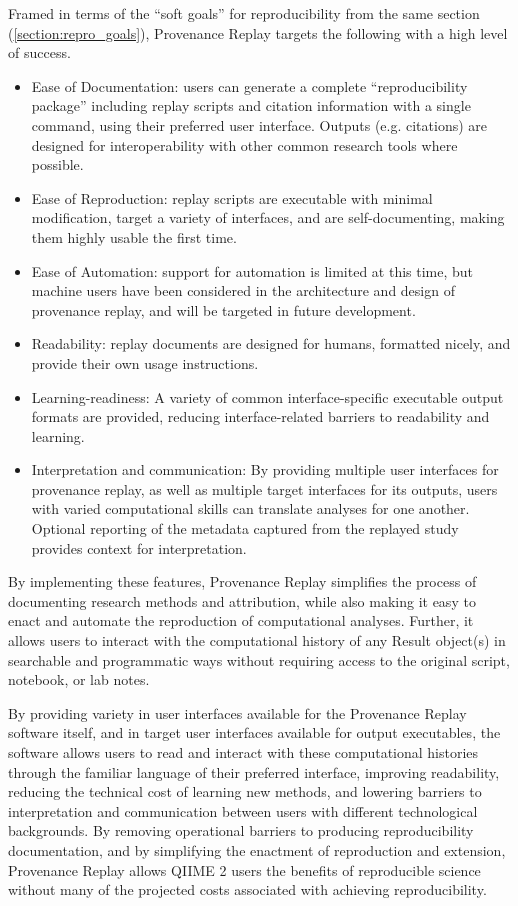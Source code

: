 Framed in terms of the “soft goals” for reproducibility from the same section (\ref{section:repro_goals}),
Provenance Replay targets the following with a high level of success.

\begin{itemize}
    \item Ease of Documentation: users can generate a complete “reproducibility
        package” including replay scripts and citation information with a single
        command, using their preferred user interface. Outputs (e.g. citations) are
        designed for interoperability with other common research tools where
        possible.
    \item Ease of Reproduction: replay scripts are executable with minimal
        modification, target a variety of interfaces, and are self-documenting,
        making them highly usable the first time.
    \item Ease of Automation: support for automation is limited at this time,
        but machine users have been considered in the architecture and design of
        provenance replay, and will be targeted in future development.
    \item Readability: replay documents are designed for humans, formatted
        nicely, and provide their own usage instructions.
    \item Learning-readiness: A variety of common interface-specific executable
        output formats are provided, reducing interface-related barriers to
        readability and learning.
    \item Interpretation and communication: By providing multiple user
        interfaces for provenance replay, as well as multiple target interfaces for
        its outputs, users with varied computational skills can translate analyses
        for one another. Optional reporting of the metadata captured from the
        replayed study provides context for interpretation.
\end{itemize}

By implementing these features, Provenance Replay simplifies the process of
documenting research methods and attribution, while also making it easy to enact
and automate the reproduction of computational analyses. Further, it allows
users to interact with the computational history of any Result object(s) in
searchable and programmatic ways without requiring access to the original
script, notebook, or lab notes.

By providing variety in user interfaces available for the Provenance Replay
software itself, and in target user interfaces available for output executables,
the software allows users to read and interact with these computational
histories through the familiar language of their preferred interface, improving
readability, reducing the technical cost of learning new methods, and lowering
barriers to interpretation and communication between users with different
technological backgrounds. By removing operational barriers to producing
reproducibility documentation, and by simplifying the enactment of reproduction
and extension, Provenance Replay allows QIIME 2 users the benefits of
reproducible science without many of the projected costs associated with
achieving reproducibility.

